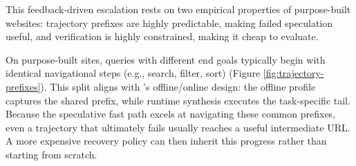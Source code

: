 This feedback-driven escalation rests on two empirical properties of purpose-built websites: trajectory prefixes are highly predictable, making failed speculation useful, and verification is highly constrained, making it cheap to evaluate.


 On purpose-built sites, queries with different end goals typically begin with identical navigational steps (e.g., search, filter, sort) (Figure \ref{fig:trajectory-prefixes}). This split aligns with \sys{}'s offline/online design: the offline profile captures the shared prefix, while runtime synthesis executes the task-specific tail. Because the speculative fast path excels at navigating these common prefixes, even a trajectory that ultimately fails usually reaches a useful intermediate URL. A more expensive recovery policy can then inherit this progress rather than starting from scratch.



